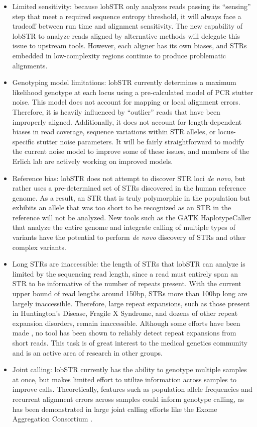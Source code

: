 \begin{itemize}
\item Limited sensitivity: because lobSTR only analyzes reads passing its ``sensing'' step that meet a required sequence entropy threshold, it will always face a tradeoff between run time and alignment sensitivity. The new capability of lobSTR to analyze reads aligned by alternative methods will delegate this issue to upstream tools. However, each aligner has its own biases, and STRs embedded in low-complexity regions continue to produce problematic alignments.
\item Genotyping model limitations: lobSTR currently determines a maximum likelihood genotype at each locus using a pre-calculated model of PCR stutter noise. This model does not account for mapping or local alignment errors. Therefore, it is heavily influenced by ``outlier'' reads that have been improperly aligned. Additionally, it does not account for length-dependent biases in read coverage, sequence variations within STR alleles, or locus-specific stutter noise parameters. It will be fairly straightforward to modify the current noise model to improve some of these issues, and members of the Erlich lab are actively working on improved models.
\item Reference bias: lobSTR does not attempt to discover STR loci \emph{de novo}, but rather uses a pre-determined set of STRs discovered in the human reference genome. As a result, an STR that is truly polymorphic in the population but exhibits an allele that was too short to be recognized as an STR in the reference will not be analyzed. New tools such as the GATK HaplotypeCaller that analyze the entire genome and integrate calling of multiple types of variants have the potential to perform \emph{de novo} discovery of STRs and other complex variants.
\item Long STRs are inaccessible: the length of STRs that lobSTR can analyze is limited by the sequencing read length, since a read must entirely span an STR to be informative of the number of repeats present. With the current upper bound of read lengths around 150bp, STRs more than 100bp long are largely inaccessible. Therefore, large repeat expansions, such as those present in Huntington's Disease, Fragile X Syndrome, and dozens of other repeat expansion disorders, remain inaccessible. Although some efforts have been made \cite{DoiMonjoHoangEtAl2013}, no tool has been shown to reliably detect repeat expansions from short reads. This task is of great interest to the medical genetics community and is an active area of research in other groups.
\item Joint calling: lobSTR currently has the ability to genotype multiple samples at once, but makes limited effort to utilize information across samples to improve calls. Theoretically, features such as population allele frequencies and recurrent alignment errors across samples could inform genotype calling, as has been demonstrated in large joint calling efforts like the Exome Aggregation Consortium \cite{EXAC}.
\end{itemize}

